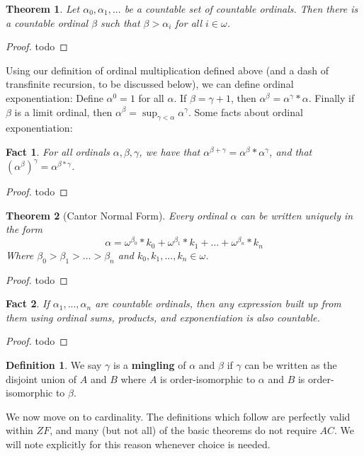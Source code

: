 \documentclass{article}
\theoremstyle{definition}
\newtheorem{definition}{Definition}[section]
\theoremstyle{plain}
\theoremstyle{theorem}
\newtheorem{fact}{Fact}[section]
\newtheorem{theorem}{Theorem}[section]
\begin{document}
\begin{theorem}
	Let $\alpha_0,\alpha_1,...$ be a countable set of countable ordinals. Then there is a countable ordinal $\beta$ such that $\beta > \alpha_i$ for all $i \in \omega$. 
\end{theorem}
\begin{proof}
	todo
\end{proof}
Using our definition of ordinal multiplication defined above (and a dash of transfinite recursion, to be discussed below), we can define ordinal exponentiation: Define $\alpha^0 = 1$ for all $\alpha$. If $\beta = \gamma+1$, then $\alpha^{\beta} = \alpha^{\gamma}*\alpha$. Finally if $\beta$ is a limit ordinal, then $\alpha^{\beta} = \sup_{\gamma< \alpha} \alpha^{\gamma}$. Some facts about ordinal exponentiation:
\begin{fact}	
	For all ordinals $\alpha,\beta,\gamma$, we have that $\alpha^{\beta+\gamma} = \alpha^\beta*\alpha^{\gamma}$, and that $(\alpha^{\beta})^{\gamma} = \alpha^{\beta*\gamma}$. 
\end{fact}
\begin{proof}
	todo
\end{proof}
\begin{theorem}[Cantor Normal Form]
	Every ordinal $\alpha$ can be written uniquely in the form 
	\[ \alpha = \omega^{\beta_0}*k_0 + \omega^{\beta_1}*k_1 + \ldots + \omega^{\beta_n} * k_n \]
	Where $\beta_0 > \beta_1 > \ldots > \beta_n$ and $k_0,k_1,...,k_n \in \omega$. 
\end{theorem}
\begin{proof}
	todo
\end{proof}
\begin{fact}
	If $\alpha_1,...,\alpha_n$ are countable ordinals, then any expression built up from them using ordinal sums, products, and exponentiation is also countable. 
\end{fact}
\begin{proof}
	todo
\end{proof}
\begin{definition}
	We say $\gamma$ is a \textbf{mingling} of $\alpha$ and $\beta$ if $\gamma$ can be written as the disjoint union of $A$ and $B$ where $A$ is order-isomorphic to $\alpha$ and $B$ is order-isomorphic to $\beta$. 
\end{definition}
We now move on to cardinality. The definitions which follow are perfectly valid within $ZF$, and many (but not all) of the basic theorems do not require $AC$. We will note explicitly for this reason whenever choice is needed. 
\end{document}
